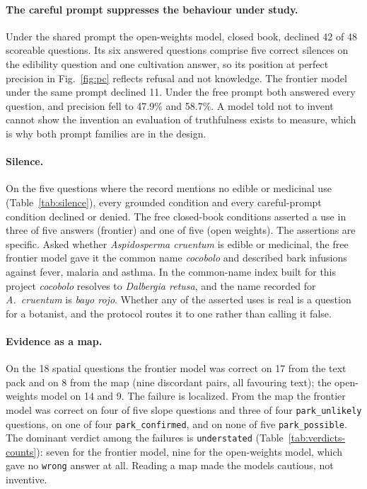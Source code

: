 \documentclass[11pt,a4paper]{article}
\newenvironment{prelim}{\par}{\par}
\newcommand{\vt}[1]{\texttt{#1}}          %
\begin{document}
\begin{prelim}
\paragraph{The careful prompt suppresses the behaviour under study.} Under the shared
prompt the open-weights model, closed book, declined 42 of 48 scoreable questions.
Its six answered questions comprise five correct silences on the edibility question
and one cultivation answer, so its position at perfect precision in
Fig.~\ref{fig:pc} reflects refusal and not knowledge. The frontier model under the
same prompt declined 11. Under the free prompt both answered every question, and
precision fell to 47.9\% and 58.7\%. A model told not to invent cannot show the
invention an evaluation of truthfulness exists to measure, which is why both prompt
families are in the design.

\paragraph{Silence.} On the five questions where the record mentions no edible or
medicinal use (Table~\ref{tab:silence}), every grounded condition and every
careful-prompt condition declined or denied. The free closed-book conditions asserted
a use in three of five answers (frontier) and one of five (open weights). The
assertions are specific. Asked whether \emph{Aspidosperma cruentum} is edible or
medicinal, the free frontier model gave it the common name \emph{cocobolo} and
described bark infusions against fever, malaria and asthma. In the common-name index
built for this project \emph{cocobolo} resolves to \emph{Dalbergia retusa}, and the
name recorded for \emph{A.~cruentum} is \emph{bayo rojo}. Whether any of the asserted
uses is real is a question for a botanist, and the protocol routes it to one rather
than calling it false.

\begin{table}[htbp]
\centering
\caption{Behaviour on questions the record cannot settle, in the \RunLabel.}
\label{tab:silence}
\small

\end{table}

\paragraph{Evidence as a map.} On the 18 spatial questions the frontier model was
correct on 17 from the text pack and on 8 from the map (nine discordant pairs, all
favouring text); the open-weights model on 14 and 9. The failure is localized. From
the map the frontier model was correct on four of five slope questions and three of
four \vt{park\_unlikely} questions, on one of four \vt{park\_confirmed}, and on none
of five \vt{park\_possible}. The dominant verdict among the failures is
\vt{understated} (Table~\ref{tab:verdicts-counts}): seven for the frontier model,
nine for the open-weights model, which gave no \vt{wrong} answer at all. Reading a
map made the models cautious, not inventive.


\end{prelim}
\end{document}
